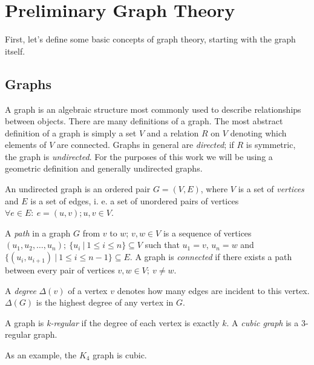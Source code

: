\chapter{Preliminary Graph Theory}\label{ch:prelim}

First, let's define some basic concepts of graph theory, starting with the graph itself.

\section{Graphs}

A graph is an algebraic structure most commonly used to describe relationships between objects. There are many definitions of a graph. The most abstract definition of a graph is simply a set $V$ and a relation $R$ on $V$ denoting which elements of $V$ are connected. Graphs in general are \textit{directed}; if $R$ is symmetric, the graph is \textit{undirected}. For the purposes of this work we will be using a geometric definition and generally undirected graphs.

\begin{definition}
    An undirected graph is an ordered pair $G = (V, E)$, where $V$ is a set of \textit{vertices} and $E$ is a set of edges, i. e. a set of unordered pairs of vertices $\forall e \in E: ~ e = (u,v); u,v \in V$.
\end{definition}

\begin{definition}
    A \textit{path} in a graph $G$ from $v$ to $w$; $v,w \in V$ is a sequence of vertices $(u_1, u_2, \dots, u_n); ~ \{u_i ~|~ 1 \leq i \leq n\} \subseteq V$ such that $u_1 = v$, $u_n = w$ and $\{(u_i, u_{i+1}) ~|~ 1 \leq i \leq n-1\} \subseteq E$. A graph is \textit{connected} if there exists a path between every pair of vertices $v,w \in V; ~ v \neq w$.
\end{definition}

\begin{definition}
    A \textit{degree} $\Delta (v)$ of a vertex $v$ denotes how many edges are incident to this vertex. $\Delta(G)$ is the highest degree of any vertex in $G$.
\end{definition}

\begin{definition}
    A graph is \textit{k-regular} if the degree of each vertex is exactly $k$. A \textit{cubic graph} is a 3-regular graph.
\end{definition}

As an example, the $K_4$ graph is cubic.

